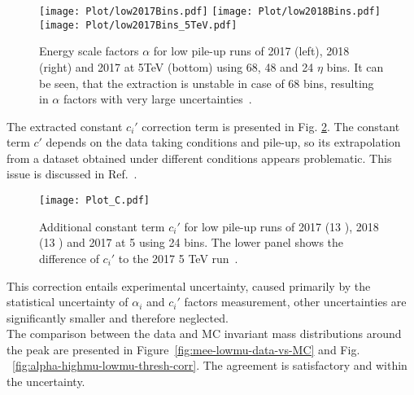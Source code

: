 \begin{table}
	\caption{Values of $\eta_{\text{calo}}$ bin frontiers for energy scale factors for low pile-up runs~\cite{int_note_electrons}.}\label{tab:lowmucalibbins}
	\label{tab:CS_BinFrontier}
\end{table}

\begin{figure}[htp]
	\begin{center}
		\texttt{[image: Plot/low2017Bins.pdf]}%
		\texttt{[image: Plot/low2018Bins.pdf]}
		\texttt{[image: Plot/low2017Bins\_5TeV.pdf]}
		\caption{ Energy scale factors $\alpha$ for low pile-up runs of
			2017 (left), 2018 (right) and 2017 at 5TeV (bottom) using 68, 48 and 24 $\eta$ 
			bins. It can be seen, that the extraction is unstable in case of 68 bins,
			resulting in $\alpha$ factors with very large uncertainties~\cite{int_note_electrons}.}
		\label{fig:alpha-lowmu-manybinnings}
	\end{center}
\end{figure}

The extracted constant $c_i'$ correction term is presented in
Fig. \ref{fig:C_lowmu}. The constant term $c'$ depends on the data taking conditions and pile-up, so its extrapolation from a dataset obtained under different conditions appears problematic. This issue is discussed in Ref.~\cite{Andari:2651890}.

\begin{figure}[htp]
	\begin{center}
		\texttt{[image: Plot\_C.pdf]}%
		\caption{ Additional constant term $c_i'$ for low pile-up runs of 
			2017 (13 \TeV), 2018 (13 \TeV) and 2017 at 5 \TeV{} using 24 bins.
			The lower panel shows the difference of $c_i'$ to the 2017 5 TeV run~\cite{int_note_electrons}.}
		\label{fig:C_lowmu}
	\end{center}
\end{figure}

This correction entails experimental uncertainty, caused primarily by the statistical uncertainty of $\alpha_i$ and $c_i'$ factors measurement, other uncertainties are significantly smaller and therefore neglected.\\
The comparison between the data and MC invariant mass distributions around the \Zee peak are presented in Figure~\ref{fig:mee-lowmu-data-vs-MC} and Fig. ~\ref{fig:alpha-highmu-lowmu-thresh-corr}. The agreement is satisfactory and within the uncertainty.

